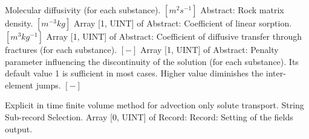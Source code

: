 \begin{RecordType}
			{\textrangle}
			{} %
			{{{Molecular diffusivity (for each substance). }{$[m^{2}s^{-1}]$}}}
		\KeyItem
			{}
			{{Abstract}{: }}
			{\textrangle}
			{} %
			{{{Rock matrix density. }{$[m^{-3}kg]$}}}
		\KeyItem
			{}
			{{Array [1, UINT] of }{Abstract}{: }}
			{\textrangle}
			{} %
			{{{Coefficient of linear sorption. }{$[m^{3}kg^{-1}]$}}}
		\KeyItem
			{}
			{{Array [1, UINT] of }{Abstract}{: }}
			{\textrangle}
			{} %
			{{{Coefficient of diffusive transfer through fractures (for each substance). }{$[-]$}}}
		\KeyItem
			{}
			{{Array [1, UINT] of }{Abstract}{: }}
			{\textrangle}
			{} %
			{{{Penalty parameter influencing the discontinuity of the solution (for each substance). Its default value 1 is sufficient in most cases. Higher value diminishes the inter-element jumps. }{$[-]$}}}
\end{RecordType}
\begin{RecordType}
	{}
	{} %
	{} %
	{} %
	{{{Explicit in time finite volume method for advection only solute transport.}}}
		\KeyItem
			{}
			{{String}}
			{\textrangle}
			{} %
			{{{Sub-record Selection.}}}
		\KeyItem
			{}
			{{Array [0, UINT] of }{Record}{: }}
			{\textrangle}
			{} %
			{}
		\KeyItem
			{}
			{{Record}{: }}
			{\textrangle}
			{} %
			{{{Setting of the fields output.}}}
\end{RecordType}
